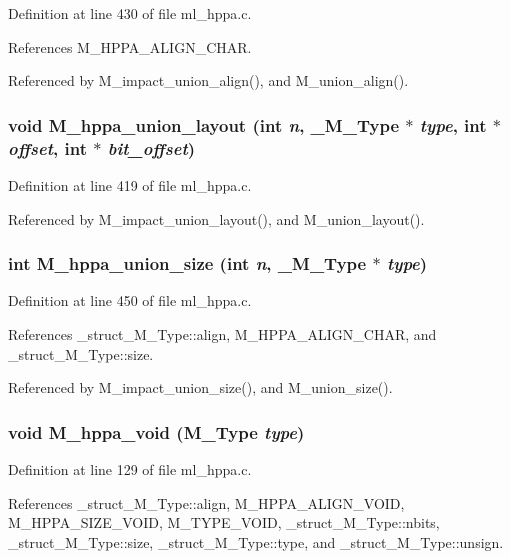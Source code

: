 Definition at line 430 of file ml\_\-hppa.c.

References M\_\-HPPA\_\-ALIGN\_\-CHAR.

Referenced by M\_\-impact\_\-union\_\-align(), and M\_\-union\_\-align().
\subsubsection{\setlength{\rightskip}{0pt plus 5cm}void M\_\-hppa\_\-union\_\-layout (int {\em n}, \bf{\_\-M\_\-Type} $\ast$ {\em type}, int $\ast$ {\em offset}, int $\ast$ {\em bit\_\-offset})}\label{ml__hppa_8c_c32cc61bf1f33e5597224a4695b06820}




Definition at line 419 of file ml\_\-hppa.c.

Referenced by M\_\-impact\_\-union\_\-layout(), and M\_\-union\_\-layout().
\subsubsection{\setlength{\rightskip}{0pt plus 5cm}int M\_\-hppa\_\-union\_\-size (int {\em n}, \bf{\_\-M\_\-Type} $\ast$ {\em type})}\label{ml__hppa_8c_6804446577d2d774d162829565cdada6}




Definition at line 450 of file ml\_\-hppa.c.

References \_\-struct\_\-M\_\-Type::align, M\_\-HPPA\_\-ALIGN\_\-CHAR, and \_\-struct\_\-M\_\-Type::size.

Referenced by M\_\-impact\_\-union\_\-size(), and M\_\-union\_\-size().
\subsubsection{\setlength{\rightskip}{0pt plus 5cm}void M\_\-hppa\_\-void (\bf{M\_\-Type} {\em type})}\label{ml__hppa_8c_d5eb60de6f2b92ee6d4a106ad96a2f79}




Definition at line 129 of file ml\_\-hppa.c.

References \_\-struct\_\-M\_\-Type::align, M\_\-HPPA\_\-ALIGN\_\-VOID, M\_\-HPPA\_\-SIZE\_\-VOID, M\_\-TYPE\_\-VOID, \_\-struct\_\-M\_\-Type::nbits, \_\-struct\_\-M\_\-Type::size, \_\-struct\_\-M\_\-Type::type, and \_\-struct\_\-M\_\-Type::unsign.

